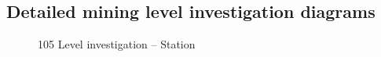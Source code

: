 \begin{appendices}
\chapter{\hspace{0.3cm}Detailed mining level investigation diagrams}\label{Manualinvestigation}
\clearpage
\begin{figure}[h!]
	\centering
	\caption{105 Level investigation -- Station}
	\label{fig: KUS Underground level layout}
\end{figure}
\begin{figure}[h!]
	\centering

\end{figure}
\end{appendices}
